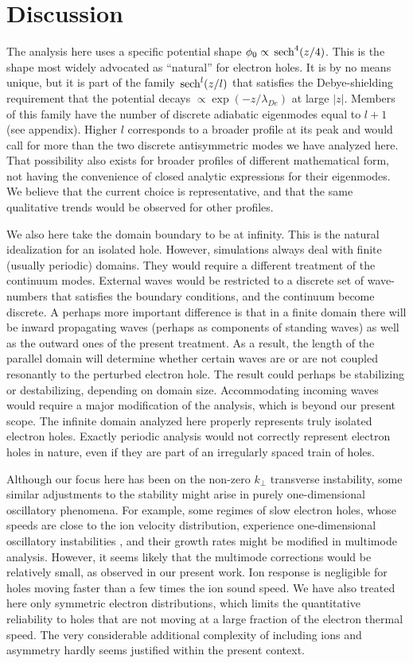 \documentclass{jpp}
\def\sech{{\,\rm sech}}
\begin{document}
\section{Discussion}

The analysis here uses a specific potential shape
$\phi_0\propto \sech^4(z/4)$. This is the shape most widely advocated
as ``natural'' for electron holes. It is by no means unique, but it is
part of the family $\sech^l(z/l)$ that satisfies the Debye-shielding
requirement that the potential decays $\propto \exp(-z/\lambda_{De})$
at large $|z|$. Members of this family have the number of discrete
adiabatic eigenmodes equal to $l+1$ (see appendix). Higher $l$
corresponds to a broader profile at its peak and would call for more
than the two discrete antisymmetric modes we have analyzed here. That
possibility also exists for broader profiles of different mathematical
form, not having the convenience of closed analytic expressions for their
eigenmodes. We believe that the current choice is representative, and
that the same qualitative trends would be observed for other profiles.

We also here take the domain boundary to be at infinity. This is the
natural idealization for an isolated hole. However, simulations always
deal with finite (usually periodic) domains. They would require a
different treatment of the continuum modes. External waves would be
restricted to a discrete set of wave-numbers that satisfies the
boundary conditions, and the continuum become discrete. A perhaps more
important difference is that in a finite domain there will be inward
propagating waves (perhaps as components of standing waves) as well as
the outward ones of the present treatment. As a result, the length of
the parallel domain will determine whether certain waves are or are
not coupled resonantly to the perturbed electron hole. The result
could perhaps be stabilizing or destabilizing, depending on domain
size. Accommodating incoming waves would require a major modification of
the analysis, which is beyond our present scope. The infinite domain
analyzed here properly represents truly isolated electron
holes. Exactly periodic analysis would not correctly represent
electron holes in nature, even if they are part of an irregularly
spaced train of holes.

Although our focus here has been on the non-zero $k_\perp$ transverse
instability, some similar adjustments to the stability might arise in
purely one-dimensional oscillatory phenomena. For example, some
regimes of slow electron holes, whose speeds are close to the ion
velocity distribution, experience one-dimensional oscillatory
instabilities \citep{Zhou2017,Hutchinson2021d}, and their growth rates
might be modified in multimode analysis. However, it seems likely that
the multimode corrections would be relatively small, as observed in
our present work. Ion response is negligible for holes moving faster
than a few times the ion sound speed. We have also treated here only
symmetric electron distributions, which limits the quantitative
reliability to holes that are not moving at a large fraction of the
electron thermal speed. The very considerable additional complexity of
including ions and asymmetry hardly seems justified within the present
context. 
\end{document}
